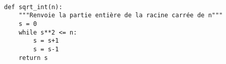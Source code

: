 \exer{}
\setcounter{numques}{0}

{}

\begin{lstlisting}

def sqrt_int(n):
    """Renvoie la partie entière de la racine carrée de n"""
    s = 0
    while s**2 <= n:
        s = s+1
        s = s-1
    return s
\end{lstlisting}

